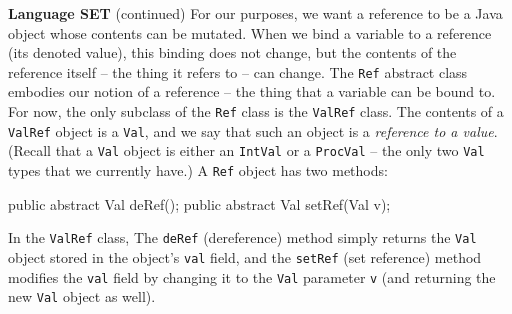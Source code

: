 \begin{minipage}[t]{\sw}
\slidenumber
\LARGE
{\bf Language SET} (continued)\exx
For our purposes, we want a reference to be
a Java object whose contents can be mutated.
When we bind a variable to a reference (its denoted value),
this binding does not change,
but the contents of the reference itself --
the thing it refers to -- can change.\exx
The \verb'Ref' abstract class embodies our notion of a reference --
the thing that a variable can be bound to.
For now, the only subclass of the \verb'Ref' class is
the \verb'ValRef' class.\exx
\emm{}\exx
The contents of a \verb'ValRef' object
is a \verb'Val',
and we say that such an object is a {\em reference to a value}.
(Recall that a \verb'Val' object is either
an \verb'IntVal' or a \verb'ProcVal' --
the only two \verb'Val' types that we currently have.)\exx
A \verb'Ref' object has two methods:
\begin{qv}
public abstract Val deRef();
public abstract Val setRef(Val v);
\end{qv}
In the \verb'ValRef' class,
The \verb'deRef' (dereference) method simply returns
the \verb'Val' object stored in the object's \verb'val' field,
and the \verb'setRef' (set reference) method
modifies the \verb'val' field
by changing it to the \verb'Val' parameter \verb'v'
(and returning the new \verb'Val' object as well).
\end{minipage}
